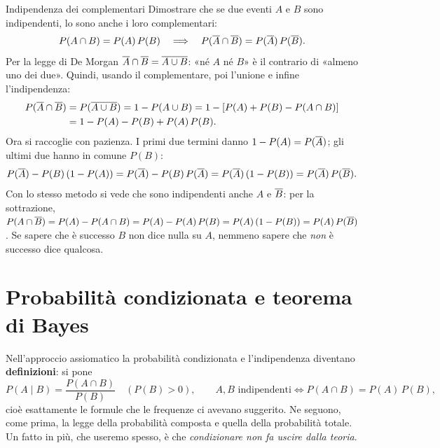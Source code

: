 \begin{esercizio}{Indipendenza dei complementari}
Dimostrare che se due eventi $A$ e $B$ sono indipendenti, lo sono anche i loro complementari:
\[ P(A \cap B) = P(A)\,P(B) \quad\Longrightarrow\quad P(\overline{A} \cap \overline{B}) = P(\overline{A})\,P(\overline{B}) . \]
\svolgimento
Per la legge di De Morgan $\overline{A} \cap \overline{B} = \overline{A \cup B}$: «né $A$ né $B$» è il contrario di «almeno
uno dei due». Quindi, usando il complementare, poi l'unione e infine l'indipendenza:
\[
\begin{aligned}
  P(\overline{A} \cap \overline{B}) &= P(\overline{A \cup B}) = 1 - P(A \cup B) = 1 - \left[ P(A) + P(B) - P(A \cap B) \right] \\
  &= 1 - P(A) - P(B) + P(A)\,P(B) .
\end{aligned}
\]
Ora si raccoglie con pazienza. I primi due termini danno $1 - P(A) = P(\overline{A})$; gli ultimi due hanno in comune
$P(B)$:
\[
  P(\overline{A}) - P(B)\left(1 - P(A)\right) = P(\overline{A}) - P(B)\,P(\overline{A})
  = P(\overline{A}) \left(1 - P(B)\right) = P(\overline{A})\,P(\overline{B}) .
\]
Con lo stesso metodo si vede che sono indipendenti anche $A$ e $\overline{B}$: per la sottrazione,
$P(A \cap \overline{B}) = P(A) - P(A \cap B) = P(A) - P(A)\,P(B) = P(A)\,(1 - P(B)) = P(A)\,P(\overline{B})$. Se sapere che
è successo $B$ non dice nulla su $A$, nemmeno sapere che \emph{non} è successo dice qualcosa.
\end{esercizio}

\section{Probabilità condizionata e teorema di Bayes}

Nell'approccio assiomatico la probabilità condizionata e l'indipendenza diventano \textbf{definizioni}: si pone
\[ P(A \mid B) = \frac{P(A \cap B)}{P(B)} \quad (P(B) > 0), \qquad
   A, B \text{ indipendenti} \iff P(A \cap B) = P(A)\,P(B) , \]
cioè esattamente le formule che le frequenze ci avevano suggerito. Ne seguono, come prima, la legge della probabilità
composta e quella della probabilità totale. Un fatto in più, che useremo spesso, è che \emph{condizionare non fa
uscire dalla teoria}.


